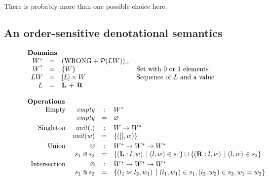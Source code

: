 There is probably more than one possible choice here.


\subsection{An order-sensitive denotational semantics} \label{sec:order-sensitive}

\newcommand{\LblValue}{LW}
\newcommand{\LblSeq}{[ \Lbl ]}
\newcommand{\Lbl}{L}
\newcommand{\lblleft}{{\bf L}}
\newcommand{\lblright}{{\bf R}}
\newcommand{\lblsemi}[2]{#1 \sconcat #2}
\newcommand{\lblunit}{\bullet}
\newcommand{\domplus}{\, + \,}
\newcommand{\msort}{\mathit{sort}}

\begin{figure}
$$
\begin{array}{l}
\text{\bf Domains} \\
\begin{array}{rcll}
\mtype & = & \mlift{(\wrong + \powerset{\LblValue})} \\
\mtyped & = & \setform{\Value} & \text{Set with 0 or 1 elements} \\
\LblValue & = & \LblSeq \times \Value & \text{Sequence of $\Lbl$ and a value} \\
\Lbl & = & \lblleft \domplus \lblright \\
\end{array} \\
\\
\text{\bf Operations} \\
\begin{array}{rrcll}
\text{Empty}        & \mempty & : &  \mtype \\
    & \mempty & = & \varnothing \\[1mm]
\text{Singleton}    & \munits{.} & : & \Value \rightarrow \mtype \\
     & \munits{w} & = & \setform{ ([], w) } \\[1mm]
\text{Union}        & \munion & : & \mtype \rightarrow \mtype \rightarrow \mtype \\
 &  s_1 \munion s_2 & = & \scompr{(\lblleft \scons l,w)}{\sbind{(l,w)}{s_1}} \cup
                                              \scompr{(\lblright \scons l, w)}{\sbind{(l,w)}{s_2}} \\[1mm]
\text{Intersection} & \mintersect & : & \mtype \rightarrow \mtype \rightarrow \mtype \\
 &  s_1 \mintersect s_2 & = & \scompr{(\lblsemi{l_1}{l_2},w_1)}{\sbind{(l_1,w_1)}{s_1}, \sbind{(l_2,w_2)}{s_2}, w_1=w_2} \\[1mm]

\end{array}
\end{array}$$
\end{figure}
